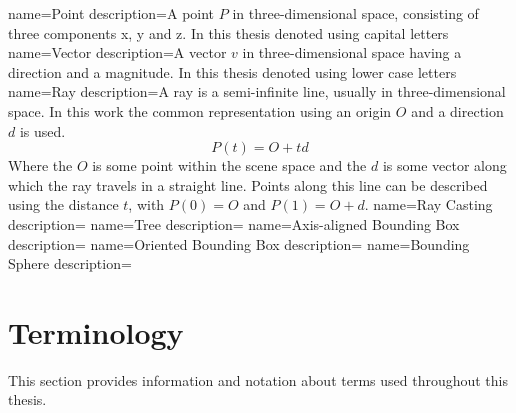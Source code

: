 \makeglossaries
{}
{
    name=Point
    description={A point $P$ in three-dimensional space, consisting of three components x, y and z. In this thesis denoted using capital letters}
}
{
    name=Vector
    description={A vector $v$ in three-dimensional space having a direction and a magnitude. In this thesis denoted using lower case letters}
}
{
    name=Ray
    description={A ray is a semi-infinite line, usually in three-dimensional space. In this work the common representation using an origin $O$ and a direction $d$ is used. 
    \[P(t)=O+td\]
    Where the $O$ is some point within the scene space and the $d$ is some vector along which the ray travels in a straight line. Points along this line can be described using the distance $t$, with $P(0)=O$ and $P(1)=O+d$.}
}
{
    name=Ray Casting
    description={}
}
{
    name=Tree
    description={}
}
{
    name=Axis-aligned Bounding Box
    description={}
}
{
    name=Oriented Bounding Box
    description={}
}
{
    name=Bounding Sphere
    description={}
}

\section{Terminology}
This section provides information and notation about terms used throughout this thesis.
\printglossary[type=\acronymtype]
\printglossary
